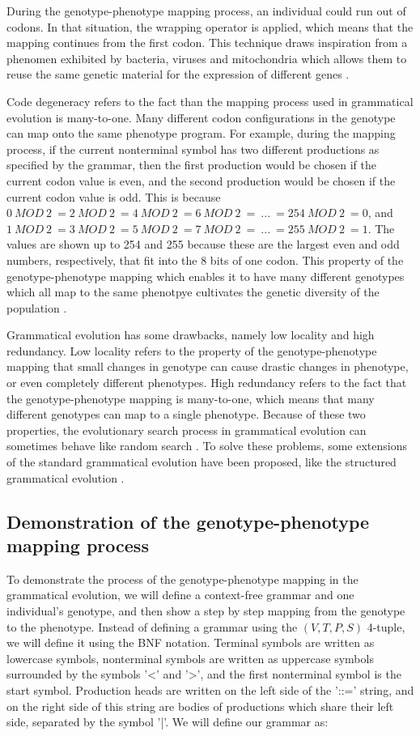 During the genotype-phenotype mapping process, an individual could run out of codons. In that situation, the wrapping operator is applied, which means that the mapping continues from the first codon. This technique draws inspiration from a phenomen exhibited by bacteria, viruses and mitochondria which allows them to reuse the same genetic material for the expression of different genes \citep{neill2003grammaticalevolution}.

Code degeneracy refers to the fact than the mapping process used in grammatical evolution is many-to-one. Many different codon configurations in the genotype can map onto the same phenotype program. For example, during the mapping process, if the current nonterminal symbol has two different productions as specified by the grammar, then the first production would be chosen if the current codon value is even, and the second production would be chosen if the current codon value is odd. This is because $0\:MOD\:2\:=2\:MOD\:2\:=4\:MOD\:2\:=6\:MOD\:2\:=\:...\:=254\:MOD\:2\:=0$, and $1\:MOD\:2\:=3\:MOD\:2\:=5\:MOD\:2\:=7\:MOD\:2\:=\:...\:=255\:MOD\:2\:=1$. The values are shown up to 254 and 255 because these are the largest even and odd numbers, respectively, that fit into the 8 bits of one codon. This property of the genotype-phenotype mapping which enables it to have many different genotypes which all map to the same phenotpye cultivates the genetic diversity of the population \citep{neill2003grammaticalevolution}.

Grammatical evolution has some drawbacks, namely low locality and high redundancy. Low locality refers to the property of the genotype-phenotype mapping that small changes in genotype can cause drastic changes in phenotype, or even completely different phenotypes. High redundancy refers to the fact that the genotype-phenotype mapping is many-to-one, which means that many different genotypes can map to a single phenotype. Because of these two properties, the evolutionary search process in grammatical evolution can sometimes behave like random search \citep{megane2022coevolutionary}. To solve these problems, some extensions of the standard grammatical evolution have been proposed, like the structured grammatical evolution \citep{lourenco2018structured}.

\subsection{Demonstration of the genotype-phenotype mapping process}
To demonstrate the process of the genotype-phenotype mapping in the grammatical evolution, we will define a context-free grammar and one individual's genotype, and then show a step by step mapping from the genotype to the phenotype. Instead of defining a grammar using the $(V, T, P, S)$ 4-tuple, we will define it using the BNF notation. Terminal symbols are written as lowercase symbols, nonterminal symbols are written as uppercase symbols surrounded by the symbols '<' and '>', and the first nonterminal symbol is the start symbol. Production heads are written on the left side of the '::=' string, and on the right side of this string are bodies of productions which share their left side, separated by the symbol '|'. We will define our grammar as:

